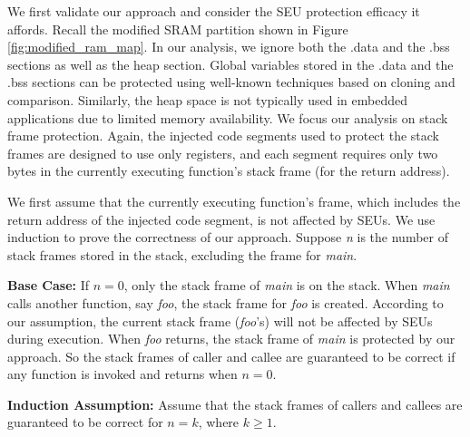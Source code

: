 We first validate our approach and consider the SEU protection efficacy it affords. Recall the modified SRAM partition shown in Figure \ref{fig:modified_ram_map}. In our analysis, we ignore both the .data and the .bss sections as well as the heap section. Global variables stored in the .data and the .bss sections can be protected using well-known techniques based on cloning and comparison. Similarly, the heap space is not typically used in embedded applications due to limited memory availability. We focus our analysis on stack frame protection. Again, the injected code segments used to protect the stack frames are designed to use only registers, and each segment requires only two bytes in the currently executing function's stack frame (for the return address).

We first assume that the currently executing function's frame, which includes the return address of the injected code segment, is not affected by SEUs. We use induction to prove the correctness of our approach. Suppose \textit{n} is the number of stack frames stored in the stack, excluding the frame for \textit{main}.

\textbf{Base Case:} If $n=0$, only the stack frame of \textit{main} is on the stack. When \textit{main} calls another function, say \textit{foo}, the stack frame for \textit{foo} is created. According to our assumption, the current stack frame (\textit{foo}'s) will not be affected by SEUs during execution. When \textit{foo} returns, the stack frame of \textit{main} is protected by our approach. So the stack frames of caller and callee are guaranteed to be correct if any function is invoked and returns when $n=0$.

\textbf{Induction Assumption:} Assume that the stack frames of callers and callees are guaranteed to be correct for $n=k$, where $k\geq 1$.

